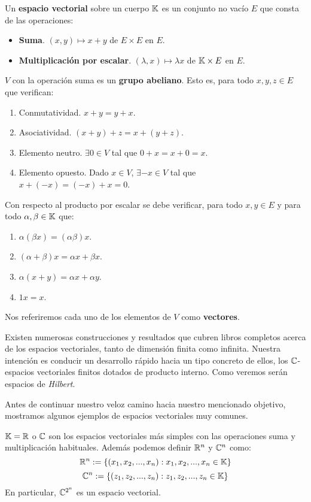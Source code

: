 \begin{definition} Un \textbf{espacio vectorial} sobre un cuerpo $\mathbb{K}$ es un conjunto no vacío $E$ que consta de las operaciones:
\begin{itemize}
\item \textbf{Suma}. $(x,y)\mapsto x+y$ de $E\times E$ en $E$.
\item \textbf{Multiplicación por escalar}. $(\lambda,x)\mapsto \lambda x$ de $\mathbb{K}\times E$ en $E$.
\end{itemize}
$V$ con la operación suma es un \textbf{grupo abeliano}. Esto es, para todo $x,y,z\in E$ que verifican:
\begin{enumerate}[label=\alph*)]
\item Conmutatividad. $x + y = y + x$.
\item Asociatividad. $(x + y) + z = x + (y + z)$.
\item Elemento neutro. $\exists 0\in V$ tal que $0+x=x+0=x$.
\item Elemento opuesto. Dado $x\in V$, $\exists -x\in V$ tal que $x+(-x)=(-x)+x=0$.
\end{enumerate}
Con respecto al producto por escalar se debe verificar, para todo $x,y\in E$ y para todo $\alpha,\beta\in\mathbb{K}$ que:
\begin{enumerate}[label=\alph*)]
\item $\alpha(\beta x)=(\alpha\beta)x$.
\item $(\alpha + \beta)x=\alpha x +\beta x$.
\item $\alpha (x + y) =\alpha x +\alpha y$.
\item $1x = x$.
\end{enumerate}
Nos referiremos cada uno de los elementos de $V$ como \textbf{vectores}.
\end{definition}

Existen numerosas construcciones y resultados que cubren libros completos acerca de los espacios vectoriales, tanto de dimensión finita como infinita. Nuestra intención es conducir un desarrollo rápido hacia un tipo concreto de ellos, los $\mathbb{C}$-espacios vectoriales finitos dotados de producto interno. Como veremos serán espacios de \textit{Hilbert}.

Antes de continuar nuestro veloz camino hacia nuestro mencionado objetivo, mostramos algunos ejemplos de espacios vectoriales muy comunes.

\begin{example} $\mathbb{K}=\mathbb{R}$ o $\mathbb{C}$ son los espacios vectoriales más simples con las operaciones suma y multiplicación habituales. Además podemos definir $\mathbb{R}^n$ y $\mathbb{C}^n$ como:
\[\mathbb{R}^n:=\{(x_1,x_2,...,x_n): x_1,x_2,...,x_n\in\mathbb{K}\}\]
\[\mathbb{C}^n:=\{(z_1,z_2,...,z_n): z_1,z_2,...,z_n\in\mathbb{K}\}\]
En particular, $\mathbb{C}^{2^n}$ es un espacio vectorial.
\end{example}

